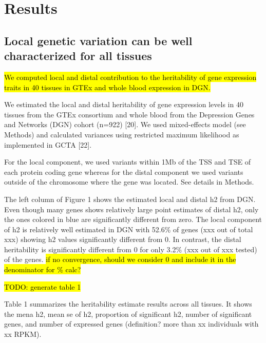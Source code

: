 \documentclass[]{article}
\begin{document}
\section{Results}\label{results}

\subsection{Local genetic variation can be well characterized for all
tissues}\label{local-genetic-variation-can-be-well-characterized-for-all-tissues}

\hl{We computed local and distal contribution to the heritability of gene expression traits in 40 tissues in GTEx and whole blood expression in DGN.}


We estimated the local and distal heritability of gene expression levels in 40 tissues from the GTEx consortium and whole blood from the Depression Genes and Networks (DGN) cohort (n=922) {[}20{]}.
We used mixed-effects model (see Methods) and calculated variances using restricted maximum likelihood as implemented in GCTA {[}22{]}.

For the local component, we used variants within 1Mb of the TSS and TSE of each protein coding gene whereas for the distal component we used variants outside of the chromosome where the gene was located. See details in Methods.

The left column of Figure 1 shows the estimated local and distal h2 from DGN. Even though many genes shows relatively large point estimates of distal h2, only the ones colored in blue are significantly different from zero. The local component of h2 is relatively well estimated in DGN with 52.6\% of genes  (xxx out of total xxx) showing h2 values significantly different from 0. In contrast, the distal heritability is significantly different from 0 for only 3.2\% (xxx out of xxx tested) of the genes. \hl{if no convergence, should we consider 0 and include it in the denominator for \% calc?}

\hl{TODO: generate table 1}

Table 1 summarizes the heritability estimate results across all tissues. It shows the mena h2, mean se of h2, proportion of significant h2, number of significant genes, and number of expressed genes (definition? more than xx individuals with xx RPKM).

\end{document}
